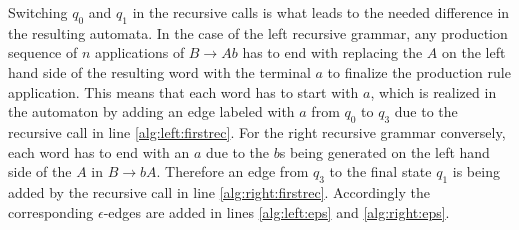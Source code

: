 Switching $q_0$ and $q_1$ in the recursive calls is what leads to the needed difference in the resulting automata. In the case of the left recursive grammar, any production sequence of $n$ applications of $B \rightarrow Ab$ has to end with replacing the $A$ on the left hand side of the resulting word with the terminal $a$ to finalize the production rule application. This means that each word has to start with $a$, which is realized in the automaton by adding an edge labeled with $a$ from $q_0$ to $q_3$ due to the recursive call in line \ref{alg:left:firstrec}. For the right recursive grammar conversely, each word has to end with an $a$ due to the $b$s being generated on the left hand side of the $A$ in $B \rightarrow bA$. Therefore an edge from $q_3$ to the final state $q_1$ is being added by the recursive call in line \ref{alg:right:firstrec}.
Accordingly the corresponding $\epsilon$-edges are added in lines \ref{alg:left:eps} and \ref{alg:right:eps}.


